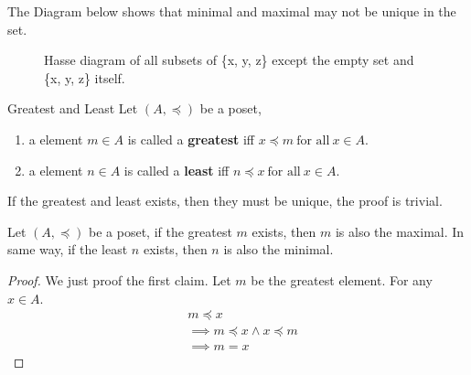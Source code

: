 \begin{examples}
  The Diagram below shows that minimal and maximal may not be unique in the set.
\end{examples}

\begin{figure}[ht]
  \centering
  \caption{Hasse diagram of all subsets of \{x, y, z\} except the
  empty set and \{x, y, z\} itself.}
\end{figure}

\begin{definition}{Greatest and Least}{}
  Let $(A,\preceq)$ be a poset,
  \begin{enumerate}

    \item a element $m \in A$ is called a \textbf{greatest} iff $x
      \preceq m \ \text{for all}\ x \in A$.
    \item a element $n \in A$ is called a \textbf{least} iff $n
      \preceq x \ \text{for all}\ x \in A$.

  \end{enumerate}

\end{definition}

\begin{remarks}
  If the greatest and least exists, then they must be unique, the
  proof is trivial.
\end{remarks}

\begin{proposition}{}{}
  Let $(A,\preceq)$ be a poset, if the greatest $m$ exists, then $m$
  is also the maximal. In same way, if the least $n$ exists, then $n$
  is also the minimal.
\end{proposition}

\begin{proof}
  We just proof the first claim. Let $m$ be the greatest element.
  For any $x \in A$.
  \begin{align*}
    &m \preceq x\\
    &\implies m \preceq x \land x \preceq m\\
    &\implies m = x
  \end{align*}
\end{proof}

